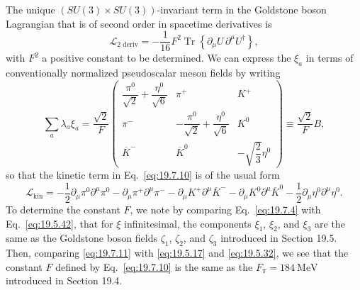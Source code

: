 The unique $(SU(3)\times SU(3))$-invariant term in the Goldstone boson Lagrangian that is of second order in spacetime derivatives is
\begin{equation}
\mathcal L_{\text{2 deriv}}
=-\frac{1}{16}F^2\operatorname{Tr}
\left\{\partial_\mu U\,\partial^\mu U^\dagger\right\},
\tag{19.7.10}\label{eq:19.7.10}
\end{equation}
with $F^2$ a positive constant to be determined. We can express the $\xi_a$ in terms of conventionally normalized pseudoscalar meson fields by writing
\begin{equation}
\sum_a\lambda_a\xi_a
=\frac{\sqrt2}{F}
\begin{pmatrix}
\dfrac{\pi^0}{\sqrt2}+\dfrac{\eta^0}{\sqrt6}&\pi^+&K^+\\[5pt]
\pi^-&-\dfrac{\pi^0}{\sqrt2}+\dfrac{\eta^0}{\sqrt6}&K^0\\[5pt]
\overline K^-&\overline K^0&-\sqrt{\dfrac23}\eta^0
\end{pmatrix}
\equiv\frac{\sqrt2}{F}B,
\tag{19.7.11}\label{eq:19.7.11}
\end{equation}
so that the kinetic term in Eq.~\eqref{eq:19.7.10} is of the usual form
\[
\mathcal L_{\text{kin}}
=-\frac12\partial_\mu\pi^0\partial^\mu\pi^0
-\partial_\mu\pi^+\partial^\mu\pi^-
-\partial_\mu K^+\partial^\mu\overline K^-
-\partial_\mu K^0\partial^\mu\overline K^0
-\frac12\partial_\mu\eta^0\partial^\mu\eta^0.
\]
To determine the constant $F$, we note by comparing Eq.~\eqref{eq:19.7.4} with Eq.~\eqref{eq:19.5.42}, that for $\xi$ infinitesimal, the components $\xi_1$, $\xi_2$, and $\xi_3$ are the same as the Goldstone boson fields $\zeta_1$, $\zeta_2$, and $\zeta_3$ introduced in Section 19.5. Then, comparing \eqref{eq:19.7.11} with \eqref{eq:19.5.17} and \eqref{eq:19.5.32}, we see that the constant $F$ defined by Eq.~\eqref{eq:19.7.10} is the same as the $F_\pi=184\ \mathrm{MeV}$ introduced in Section 19.4.

